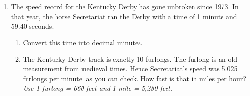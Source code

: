 \documentclass[12pt]{article}
\begin{document}
\begin{enumerate}
\newpage

\item The speed record for the Kentucky Derby has gone unbroken since 1973.  In that year, the horse Secretariat ran the Derby with a time of 1 minute and 59.40 seconds.

\begin{enumerate}
\item Convert this time into decimal minutes.
\vfill
\vfill
\item The Kentucky Derby track is exactly 10 furlongs.  The furlong is an old measurement from medieval times.  Hence Secretariat's speed was 5.025 furlongs per minute, as you can check.  How fast is that in miles per hour?  \emph{Use 1 furlong = 660 feet and 1 mile = 5,280 feet.}
\vfill
\vfill
\vfill
\end{enumerate}

\end{enumerate}
\end{document}
